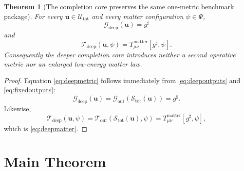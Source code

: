 \documentclass[11pt]{article}
\newcommand{\CompletedMetric}{g^{\sharp}}
\newcommand{\MetricOut}{\mathscr G_{\mathrm{out}}}
\newcommand{\MatterOut}{\mathscr T_{\mathrm{out}}}
\newcommand{\DeepMetricOut}{\mathscr G_{\mathrm{deep}}}
\newcommand{\DeepMatterOut}{\mathscr T_{\mathrm{deep}}}
\newcommand{\DeepShell}{\mathcal U_{\mathrm{tot}}}
\newcommand{\ChainSelectTriple}{\mathcal S_{\mathrm{tot}}}
\newtheorem{theorem}{Theorem}
\begin{document}
\begin{theorem}[The completion core preserves the same one-metric benchmark package]
\label{thm:outputs}
For every \(\mathbf u\in\DeepShell\) and every matter configuration \(\psi\in\Psi\),
\begin{equation}
\DeepMetricOut(\mathbf u)=\CompletedMetric
\label{eq:deepmetric}
\end{equation}
and
\begin{equation}
\DeepMatterOut(\mathbf u,\psi)
=
T_{\mu\nu}^{\mathrm{matter}}[\CompletedMetric,\psi].
\label{eq:deepmatter}
\end{equation}
Consequently the deeper completion core introduces neither a second operative metric nor an enlarged low-energy matter law.
\end{theorem}

\begin{proof}
Equation \eqref{eq:deepmetric} follows immediately from \eqref{eq:deepoutputs} and \eqref{eq:fixedoutputs}:
\[
\DeepMetricOut(\mathbf u)
=
\MetricOut(\ChainSelectTriple(\mathbf u))
=
\CompletedMetric.
\]
Likewise,
\[
\DeepMatterOut(\mathbf u,\psi)
=
\MatterOut(\ChainSelectTriple(\mathbf u),\psi)
=
T_{\mu\nu}^{\mathrm{matter}}[\CompletedMetric,\psi],
\]
which is \eqref{eq:deepmatter}.
\end{proof}

\section{Main Theorem}
\end{document}
